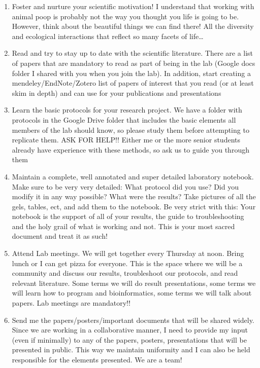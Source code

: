 \documentclass[
]{book}
\begin{document}
\begin{enumerate}
\def\labelenumi{\arabic{enumi}.}
\item
  Foster and nurture your scientific motivation! I understand that working with animal poop is probably not the way you thought you life is going to be. However, think about the beautiful things we can find there! All the diversity and ecological interactions that reflect so many facets of life\ldots{}
\item
  Read and try to stay up to date with the scientific literature. There are a list of papers that are mandatory to read as part of being in the lab (Google docs folder I shared with you when you join the lab). In addition, start creating a mendeley/EndNote/Zotero list of papers of interest that you read (or at least skim in depth) and can use for your publications and presentations
\item
  Learn the basic protocols for your research project. We have a folder with protocols in the Google Drive folder that includes the basic elements all members of the lab should know, so please study them before attempting to replicate them. ASK FOR HELP!! Either me or the more senior students already have experience with these methods, so ask us to guide you through them
\item
  Maintain a complete, well annotated and super detailed laboratory notebook. Make sure to be very very detailed: What protocol did you use? Did you modify it in any way possible? What were the results? Take pictures of all the gels, tables, ect, and add them to the notebook. Be very strict with this: Your notebook is the support of all of your results, the guide to troubleshooting and the holy grail of what is working and not. This is your most sacred document and treat it as such!
\item
  Attend Lab meetings. We will get together every Thursday at noon. Bring lunch or I can get pizza for everyone. This is the space where we will be a community and discuss our results, troubleshoot our protocols, and read relevant literature. Some terms we will do result presentations, some terms we will learn how to program and bioinformatics, some terms we will talk about papers. Lab meetings are mandatory!!
\item
  Send me the papers/posters/important documents that will be shared widely. Since we are working in a collaborative manner, I need to provide my input (even if minimally) to any of the papers, posters, presentations that will be presented in public. This way we maintain uniformity and I can also be held responsible for the elements presented. We are a team!
\end{enumerate}
\end{document}
